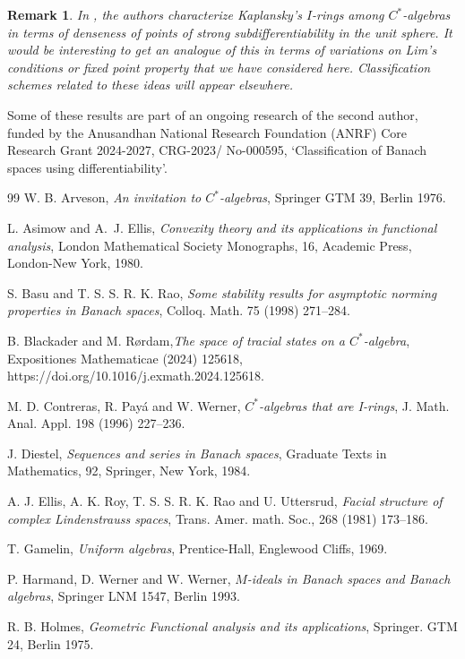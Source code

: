 \documentclass[11pt]{amsart}
\newtheorem{rem}[thm]{Remark}
\begin{document}
 \begin{rem}
In \cite{CPW}, the authors characterize Kaplansky's $I$-rings among $C^\ast$-algebras in terms of denseness of points of strong subdifferentiability in the unit sphere. It would be interesting	to get an analogue of this in terms of variations on Lim's conditions or fixed point property that we have considered here.  Classification schemes related to these ideas will appear elsewhere.
 \end{rem}
\smallskip
Some of these results are part of an ongoing research of the second author, funded by the Anusandhan National Research Foundation (ANRF) Core Research Grant 2024-2027, CRG-2023/ No-000595, `Classification of Banach spaces using differentiability'.
\smallskip
\begin{thebibliography}{99}
 W. B. Arveson, {\em An invitation to $C^*$-algebras}, Springer GTM 39, Berlin 1976.

 L. Asimow and A.~J. Ellis, {\em Convexity theory and its applications in functional analysis}, London Mathematical Society Monographs, 16, Academic Press, London-New York, 1980.

S. Basu and T. S. S. R. K. Rao, {\em Some stability results for asymptotic norming properties in Banach spaces}, Colloq. Math. 75 (1998) 271--284.

 B. Blackader and M. R{\o}rdam,{\em The space of tracial states on a $C^*$-algebra},  Expositiones Mathematicae (2024) 125618,
https://doi.org/10.1016/j.exmath.2024.125618. 

 M. D. Contreras, R. Pay\'a and W. Werner, {\em $C^*$-algebras that are I-rings}, J. Math. Anal. Appl. 198 (1996) 227--236.

 J. Diestel, \emph{Sequences and series in Banach spaces}, Graduate Texts in Mathematics, 92, Springer, New York, 1984.

 A. J. Ellis, A. K. Roy, T. S. S. R. K. Rao and U. Uttersrud, {\em Facial structure of complex Lindenstrauss spaces}, Trans. Amer. math. Soc., 268 (1981) 173--186.
    
 T. Gamelin, {\em Uniform algebras}, Prentice-Hall, Englewood Cliffs, 1969.
    
 P. Harmand, D. Werner and W. Werner, {\em $M$-ideals in Banach spaces and Banach algebras}, Springer LNM 1547, Berlin 1993.

 R. B. Holmes, {\em Geometric Functional analysis and its applications}, Springer. GTM 24, Berlin 1975.


\end{thebibliography}
\end{document}
